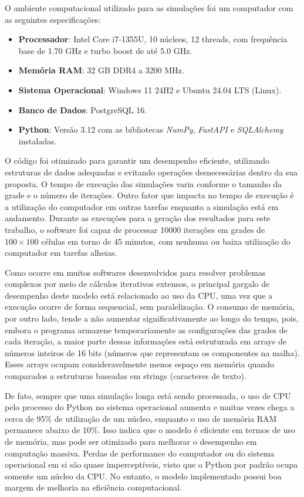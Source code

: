 \documentclass[12pt,oneside]{report}
\begin{document}
O ambiente computacional utilizado para as simulações foi um computador com as seguintes especificações:
\begin{itemize}
    \item \textbf{Processador}: Intel Core i7-1355U, 10 núcleos, 12 threads, com frequência base de 1.70 GHz e turbo boost de até 5.0 GHz.
    \item \textbf{Memória RAM}: 32 GB DDR4 a 3200 MHz.
    \item \textbf{Sistema Operacional}: Windows 11 24H2 e Ubuntu 24.04 LTS (Linux).
    \item \textbf{Banco de Dados}: PostgreSQL 16.
    \item \textbf{Python}: Versão 3.12 com as bibliotecas \textit{NumPy}, \textit{FastAPI} e \textit{SQLAlchemy} instaladas.
\end{itemize}

O código foi otimizado para garantir um desempenho eficiente, utilizando estruturas de dados adequadas e evitando operações desnecessárias dentro da sua proposta. O tempo de execução das simulações varia conforme o tamanho da grade e o número de iterações. Outro fator que impacta no tempo de execução é a utilização do computador em outras tarefas enquanto a simulação está em andamento. Durante as execuções para a geração dos resultados para este trabalho, o software foi capaz de processar 10000 iterações em grades de $100 \times 100$ células em torno de 45 minutos, com nenhuma ou baixa utilização do computador em tarefas alheias.

Como ocorre em muitos softwares desenvolvidos para resolver problemas complexos por meio de cálculos iterativos extensos, o principal gargalo de desempenho deste modelo está relacionado ao uso da CPU, uma vez que a execução ocorre de forma sequencial, sem paralelização. O consumo de memória, por outro lado, tende a não aumentar significativamente ao longo do tempo, pois, embora o programa armazene temporariamente as configurações das grades de cada iteração, a maior parte dessas informações está estruturada em arrays de números inteiros de 16 bits (números que representam os componentes na malha). Esses arrays ocupam consideravelmente menos espaço em memória quando comparados a estruturas baseadas em strings (caracteres de texto).

De fato, sempre que uma simulação longa está sendo processada, o uso de CPU pelo processo do Python no sistema operacional aumenta e muitas vezes chega a cerca de 95\% de utilização de um núcleo, enquanto o uso de memória RAM permanece abaixo de 10\%. Isso indica que o modelo é eficiente em termos de uso de memória, mas pode ser otimizado para melhorar o desempenho em computação massiva. Perdas de performance do computador ou do sistema operacional em si são quase imperceptíveis, visto que o Python por padrão ocupa somente um núcleo da CPU. No entanto, o modelo implementado possui boa margem de melhoria na eficiência computacional.
\end{document}
